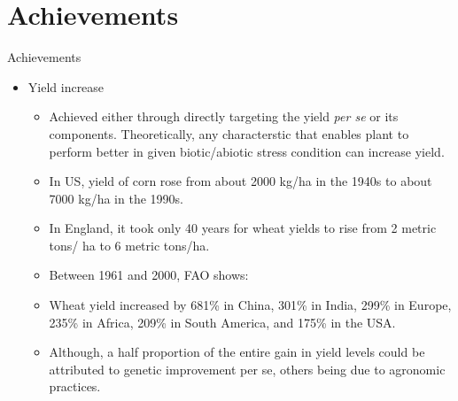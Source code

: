\documentclass[11pt,ignorenonframetext,aspectratio=169]{beamer}
\providecommand{\tightlist}{%
  \setlength{\itemsep}{0pt}\setlength{\parskip}{0pt}}
\begin{document}
\hypertarget{achievements}{%
\section{Achievements}\label{achievements}}

\begin{frame}{Achievements}
\begin{itemize}
\tightlist
\item
  Yield increase

  \begin{itemize}
  \tightlist
  \item
    Achieved either through directly targeting the yield \emph{per se}
    or its components. Theoretically, any characterstic that enables
    plant to perform better in given biotic/abiotic stress condition can
    increase yield.
  \item
    In US, yield of corn rose from about 2000 kg/ha in the 1940s to
    about 7000 kg/ha in the 1990s.
  \item
    In England, it took only 40 years for wheat yields to rise from 2
    metric tons/ ha to 6 metric tons/ha.
  \item
    Between 1961 and 2000, FAO shows:
  \item
    Wheat yield increased by 681\% in China, 301\% in India, 299\% in
    Europe, 235\% in Africa, 209\% in South America, and 175\% in the
    USA.
  \item
    Although, a half proportion of the entire gain in yield levels could
    be attributed to genetic improvement per se, others being due to
    agronomic practices.
  \end{itemize}
\end{itemize}
\end{frame}
\end{document}
